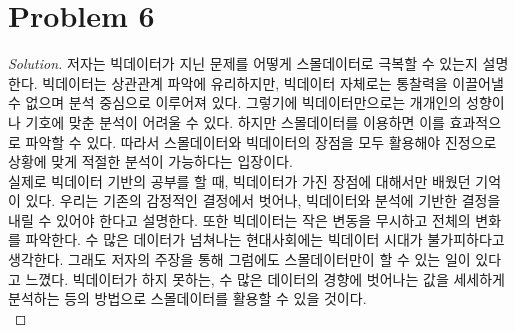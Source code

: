 \section*{Problem 6}
	\begin{proof} [Solution]
		저자는 빅데이터가 지닌 문제를 어떻게 스몰데이터로 극복할 수 있는지 설명한다. 빅데이터는 상관관계 파악에 유리하지만, 빅데이터 자체로는 통찰력을 이끌어낼 수 없으며 분석 중심으로 이루어져 있다. 그렇기에 빅데이터만으로는 개개인의 성향이나 기호에 맞춘 분석이 어려울 수 있다. 하지만 스몰데이터를 이용하면 이를 효과적으로 파악할 수 있다. 따라서 스몰데이터와 빅데이터의 장점을 모두 활용해야 진정으로 상황에 맞게 적절한 분석이 가능하다는 입장이다.\\
		실제로 빅데이터 기반의 공부를 할 때, 빅데이터가 가진 장점에 대해서만 배웠던 기억이 있다. 우리는 기존의 감정적인 결정에서 벗어나, 빅데이터와 분석에 기반한 결정을 내릴 수 있어야 한다고 설명한다. 또한 빅데이터는 작은 변동을 무시하고 전체의 변화를 파악한다. 수 많은 데이터가 넘쳐나는 현대사회에는 빅데이터 시대가 불가피하다고 생각한다. 그래도 저자의 주장을 통해 그럼에도 스몰데이터만이 할 수 있는 일이 있다고 느꼈다. 빅데이터가 하지 못하는, 수 많은 데이터의 경향에 벗어나는 값을 세세하게 분석하는 등의 방법으로 스몰데이터를 활용할 수 있을 것이다.\\
	\end{proof}